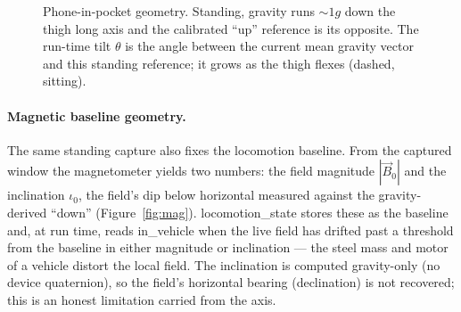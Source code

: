 \documentclass[11pt]{article}
\newcommand{\axis}[1]{\textsf{#1}}          %
\begin{document}
\begin{figure}[h]
\centering
{}
\caption{Phone-in-pocket geometry. Standing, gravity runs $\sim 1g$ down the thigh long
axis and the calibrated ``up'' reference is its opposite. The run-time tilt $\theta$ is
the angle between the current mean gravity vector and this standing reference; it grows
as the thigh flexes (dashed, sitting).}
\label{fig:pocket}
\end{figure}

\paragraph{Magnetic baseline geometry.}
The same standing capture also fixes the locomotion baseline. From the captured window
the magnetometer yields two numbers: the field magnitude $|\vec B_0|$ and the
inclination $\iota_0$, the field's dip below horizontal measured against the
gravity-derived ``down'' (Figure~\ref{fig:mag}). \axis{locomotion\_state} stores these as
the baseline and, at run time, reads \textsf{in\_vehicle} when the live field has drifted
past a threshold from the baseline in either magnitude or inclination --- the steel mass
and motor of a vehicle distort the local field. The inclination is computed gravity-only
(no device quaternion), so the field's horizontal bearing (declination) is not recovered;
this is an honest limitation carried from the axis.
\end{document}
